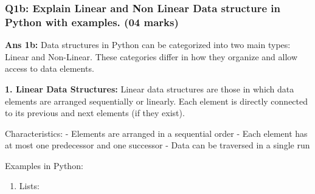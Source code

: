 \begin{Shaded}
\begin{Highlighting}[]
\end{Highlighting}
\end{Shaded}

\hypertarget{q1b-explain-linear-and-non-linear-data-structure-in-python-with-examples.-04-marks}{%
\subsubsection{Q1b: Explain Linear and Non Linear Data structure in
Python with examples. (04
marks)}\label{q1b-explain-linear-and-non-linear-data-structure-in-python-with-examples.-04-marks}}

\textbf{Ans 1b:} Data structures in Python can be categorized into two
main types: Linear and Non-Linear. These categories differ in how they
organize and allow access to data elements.

\textbf{1. Linear Data Structures:} Linear data structures are those in
which data elements are arranged sequentially or linearly. Each element
is directly connected to its previous and next elements (if they exist).

Characteristics: - Elements are arranged in a sequential order - Each
element has at most one predecessor and one successor - Data can be
traversed in a single run

Examples in Python:

\begin{enumerate}
\def\labelenumi{\alph{enumi})}
\tightlist
\item
  Lists:
\end{enumerate}

\begin{Shaded}
\begin{Highlighting}[]
\OperatorTok{=}\NormalTok{ [}\NormalTok{, }\NormalTok{, }\NormalTok{]}
\NormalTok{(fruits[}\NormalTok{])  }
\end{Highlighting}
\end{Shaded}

